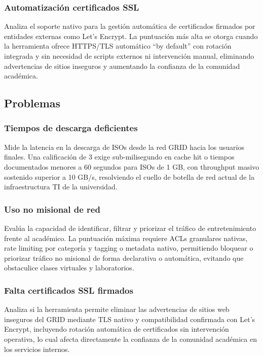 \subsubsection{Automatización certificados SSL}

Analiza el soporte nativo para la gestión automática de certificados firmados por entidades externas como Let's Encrypt. La puntuación más alta se otorga cuando la herramienta ofrece HTTPS/TLS automático ``by default'' con rotación integrada y sin necesidad de scripts externos ni intervención manual, eliminando advertencias de sitios inseguros y aumentando la confianza de la comunidad académica.

\subsection{Problemas}

\subsubsection{Tiempos de descarga deficientes}

Mide la latencia en la descarga de ISOs desde la red GRID hacia los usuarios finales. Una calificación de 3 exige sub-milisegundo en cache hit o tiempos documentados menores a 60 segundos para ISOs de 1 GB, con throughput masivo sostenido superior a 10 GB/s, resolviendo el cuello de botella de red actual de la infraestructura TI de la universidad.

\subsubsection{Uso no misional de red}

Evalúa la capacidad de identificar, filtrar y priorizar el tráfico de entretenimiento frente al académico. La puntuación máxima requiere ACLs granulares nativas, rate limiting por categoría y tagging o metadata nativo, permitiendo bloquear o priorizar tráfico no misional de forma declarativa o automática, evitando que obstaculice clases virtuales y laboratorios.

\subsubsection{Falta certificados SSL firmados}

Analiza si la herramienta permite eliminar las advertencias de sitios web inseguros del GRID mediante TLS nativo y compatibilidad confirmada con Let's Encrypt, incluyendo rotación automática de certificados sin intervención operativa, lo cual afecta directamente la confianza de la comunidad académica en los servicios internos.

